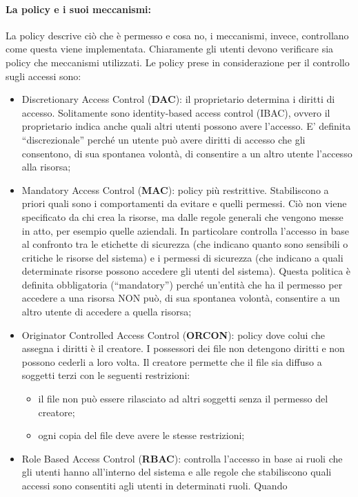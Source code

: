\paragraph{La policy e i suoi meccanismi: }
La policy descrive ciò che è permesso e cosa no, i meccanismi,
invece, controllano come questa viene implementata. Chiaramente gli utenti devono verificare sia policy che meccanismi utilizzati. Le policy prese in considerazione per il controllo sugli accessi sono:
\begin{itemize}
      \item Discretionary Access Control (\textbf{DAC}): il proprietario determina i diritti di accesso. Solitamente sono identity-based access control (IBAC), ovvero il proprietario indica anche quali altri utenti possono avere l'accesso. E' definita ``discrezionale'' perché un utente può avere diritti di accesso che gli consentono, di sua spontanea volontà, di consentire a un altro utente l'accesso alla risorsa;
      \item Mandatory Access Control (\textbf{MAC}): policy più restrittive. Stabiliscono a priori quali sono i comportamenti da evitare e quelli permessi. Ciò non viene specificato da chi crea la risorse, ma dalle regole generali che vengono messe in atto, per esempio quelle aziendali. In particolare controlla l'accesso in base al confronto tra le etichette di sicurezza (che indicano quanto sono sensibili o critiche le risorse del sistema) e i permessi di sicurezza (che indicano a quali determinate risorse possono accedere gli utenti del sistema). Questa politica è definita obbligatoria (``mandatory'') perché un'entità che ha il permesso per accedere a una risorsa NON può, di sua spontanea volontà, consentire a un altro utente di accedere a quella risorsa;
      \item Originator Controlled Access Control (\textbf{ORCON}): policy dove colui che assegna i diritti è il creatore. I possessori dei file non detengono diritti e non possono cederli a loro volta. Il creatore permette che il file sia diffuso a soggetti terzi con le seguenti restrizioni:
      \begin{itemize}
      	\item il file non può essere rilasciato ad altri soggetti senza il permesso del creatore;
      	\item ogni copia del file deve avere le stesse restrizioni;
      \end{itemize}
      \item Role Based Access Control (\textbf{RBAC}): controlla l'accesso in base ai ruoli che gli utenti hanno all'interno del sistema e alle regole che stabiliscono quali accessi sono consentiti agli utenti in determinati ruoli. Quando

\end{itemize}
